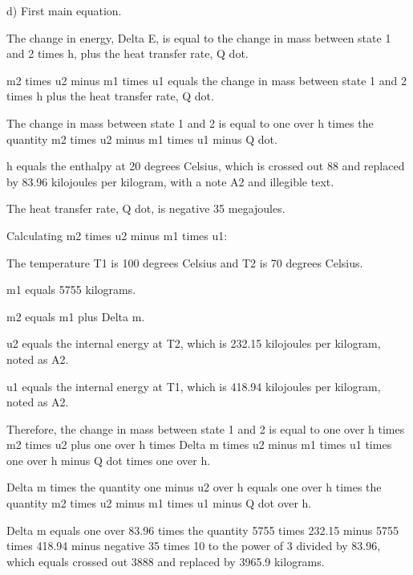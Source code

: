 d) First main equation.

The change in energy, Delta E, is equal to the change in mass between state 1 and 2 times h, plus the heat transfer rate, Q dot.

m2 times u2 minus m1 times u1 equals the change in mass between state 1 and 2 times h plus the heat transfer rate, Q dot.

The change in mass between state 1 and 2 is equal to one over h times the quantity m2 times u2 minus m1 times u1 minus Q dot.

h equals the enthalpy at 20 degrees Celsius, which is crossed out 88 and replaced by 83.96 kilojoules per kilogram, with a note A2 and illegible text.

The heat transfer rate, Q dot, is negative 35 megajoules.

Calculating m2 times u2 minus m1 times u1:

The temperature T1 is 100 degrees Celsius and T2 is 70 degrees Celsius.

m1 equals 5755 kilograms.

m2 equals m1 plus Delta m.

u2 equals the internal energy at T2, which is 232.15 kilojoules per kilogram, noted as A2.

u1 equals the internal energy at T1, which is 418.94 kilojoules per kilogram, noted as A2.

Therefore, the change in mass between state 1 and 2 is equal to one over h times m2 times u2 plus one over h times Delta m times u2 minus m1 times u1 times one over h minus Q dot times one over h.

Delta m times the quantity one minus u2 over h equals one over h times the quantity m2 times u2 minus m1 times u1 minus Q dot over h.

Delta m equals one over 83.96 times the quantity 5755 times 232.15 minus 5755 times 418.94 minus negative 35 times 10 to the power of 3 divided by 83.96, which equals crossed out 3888 and replaced by 3965.9 kilograms.